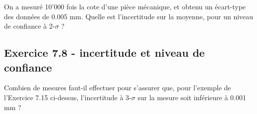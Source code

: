 On a mesuré 10'000 fois la cote d'une pièce mécanique, et obtenu un écart-type des données de 0.005 mm. Quelle est l'incertitude sur la moyenne, pour un niveau de confiance à 2-$\sigma$ ?

\subsection*{Exercice 7.8 - incertitude et niveau de confiance}

Combien de mesures faut-il effectuer pour s'assurer que, pour l'exemple de l'Exercice 7.15 ci-dessus, l'incertitude à 3-$\sigma$ sur la mesure soit inférieure à 0.001 mm ?